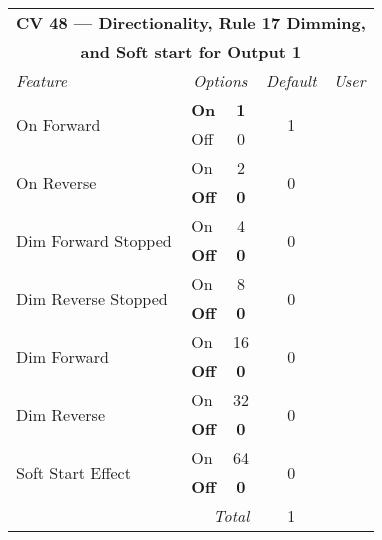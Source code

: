 \documentclass[12pt,letterpaper,draft]{memoir} %
\begin{document}
\label{CV48}
\begin{center}
\begin{tabular}{|l|lc|c|c|}
\hline
\multicolumn{5}{|c|}{\textbf{CV 48 --- Directionality, Rule 17 Dimming,}} \\
\multicolumn{5}{|c|}{\textbf{and Soft start for Output 1}} \\ \hline \hline
\textit{Feature} & \multicolumn{2}{c|}{\textit{Options}} & \textit{Default} & \textit{User} \\ \hline
\multirow{2}{*}{On Forward}	& \textbf{On}	& \textbf{1} 	& \multirow{2}{*}{1} 	&\\
			& Off 		& 0 			& 				& \\ \hline
\multirow{2}{*}{On Reverse}	& On			& 2 			& \multirow{2}{*}{0} 	&\\
			& \textbf{Off} 	& \textbf{0} 	& 				& \\ \hline
\multirow{2}{*}{Dim Forward Stopped}	& On			& 4 			& \multirow{2}{*}{0} 	&\\
			& \textbf{Off} 	& \textbf{0} 	& 				& \\ \hline
\multirow{2}{*}{Dim Reverse Stopped}	& On			& 8 			& \multirow{2}{*}{0} 	&\\
			& \textbf{Off} 	& \textbf{0} 	& 				& \\ \hline
\multirow{2}{*}{Dim Forward}	& On			& 16 			& \multirow{2}{*}{0} 	&\\
			& \textbf{Off} 	& \textbf{0} 	& 				& \\ \hline
\multirow{2}{*}{Dim Reverse}	& On			& 32 			& \multirow{2}{*}{0} 	&\\
			& \textbf{Off} 	& \textbf{0} 	& 				& \\ \hline
\multirow{2}{*}{Soft Start Effect}	& On			& 64 			& \multirow{2}{*}{0} 	&\\
			& \textbf{Off} 	& \textbf{0} 	& 				& \\ \hline\hline
\multicolumn{3}{|r|}{\textit{Total}} & 1 &\\ \hline
\end{tabular}
\end{center}
\end{document}
